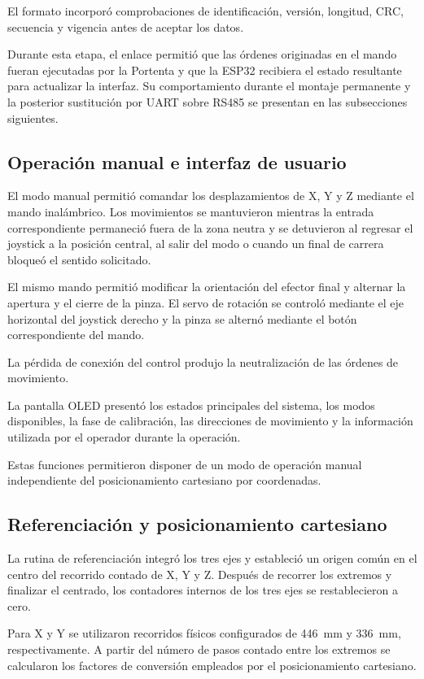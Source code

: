 El formato incorporó comprobaciones de identificación, versión, longitud, CRC, secuencia y vigencia antes de aceptar los datos.

Durante esta etapa, el enlace permitió que las órdenes originadas en el mando fueran ejecutadas por la Portenta y que la ESP32 recibiera el estado resultante para actualizar la interfaz. Su comportamiento durante el montaje permanente y la posterior sustitución por UART sobre RS485 se presentan en las subsecciones siguientes.


\subsection{Operación manual e interfaz de usuario}

El modo manual permitió comandar los desplazamientos de X, Y y Z mediante el mando inalámbrico. Los movimientos se mantuvieron mientras la entrada correspondiente permaneció fuera de la zona neutra y se detuvieron al regresar el joystick a la posición central, al salir del modo o cuando un final de carrera bloqueó el sentido solicitado.

El mismo mando permitió modificar la orientación del efector final y alternar la apertura y el cierre de la pinza. El servo de rotación se controló mediante el eje horizontal del joystick derecho y la pinza se alternó mediante el botón correspondiente del mando.

La pérdida de conexión del control produjo la neutralización de las órdenes de movimiento.

La pantalla OLED presentó los estados principales del sistema, los modos disponibles, la fase de calibración, las direcciones de movimiento y la información utilizada por el operador durante la operación.

Estas funciones permitieron disponer de un modo de operación manual independiente del posicionamiento cartesiano por coordenadas.


\subsection{Referenciación y posicionamiento cartesiano}

La rutina de referenciación integró los tres ejes y estableció un origen común en el centro del recorrido contado de X, Y y Z. Después de recorrer los extremos y finalizar el centrado, los contadores internos de los tres ejes se restablecieron a cero.

Para X y Y se utilizaron recorridos físicos configurados de 446~mm y 336~mm, respectivamente. A partir del número de pasos contado entre los extremos se calcularon los factores de conversión empleados por el posicionamiento cartesiano.

